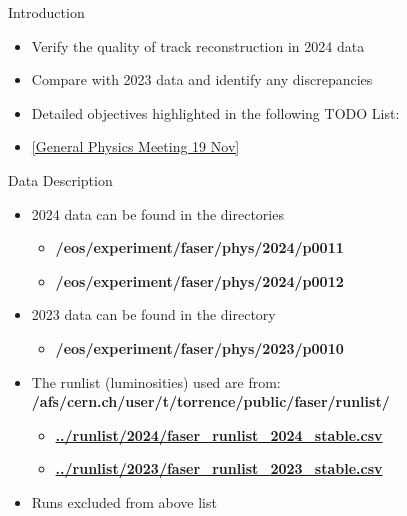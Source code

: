 \begin{frame}{Introduction}
    \begin{itemize}
        \item Verify the quality of track reconstruction in 2024 data
        \item Compare with 2023 data and identify any discrepancies
        \item Detailed objectives highlighted in the following TODO List:
        \item[] \href{https://indico.cern.ch/event/1476946/?note=304369}{[General Physics Meeting 19 Nov]}
    \end{itemize}
\end{frame}

\begin{frame}{Data Description}
    \begin{itemize}
        \item 2024 data can be found in the directories
              \begin{itemize}
                  \item \textbf{/eos/experiment/faser/phys/2024/p0011}
                  \item \textbf{/eos/experiment/faser/phys/2024/p0012}
              \end{itemize}
        \item 2023 data can be found in the directory
              \begin{itemize}
                  \item \textbf{/eos/experiment/faser/phys/2023/p0010}
              \end{itemize}
        \item The runlist (luminosities) used are from:
              \textbf{/afs/cern.ch/user/t/torrence/public/faser/runlist/}
              \begin{itemize}
                  \item \href{/afs/cern.ch/user/t/torrence/public/faser/runlist/2024/faser_runlist_2024_stable.csv}{\textbf{../runlist/2024/faser\_runlist\_2024\_stable.csv}}
                  \item \href{/afs/cern.ch/user/t/torrence/public/faser/runlist/2023/faser_runlist_2023_stable.csv}{\textbf{../runlist/2023/faser\_runlist\_2023\_stable.csv}}
              \end{itemize}
        \item Runs excluded from above list

\end{itemize}
\end{frame}
